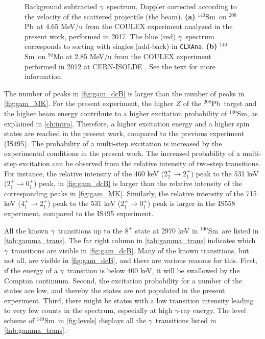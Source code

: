 \documentclass[twoside,english]{uiofysmaster/uiofysmaster}
\newcommand{\Sm}{$^{140}$Sm} %
\newcommand{\Pb}{$^{208}$Pb}
\newcommand{\ga}{$\gamma$}
\let\orgautoref\autoref
\renewcommand{\autoref}
        {%
		 \def\sectionautorefname{Section}%
		 \def\subsectionautorefname{Section}%
		 \def\subsubsectionautorefname{Section}%
		 \def\chapterautorefname{Chapter}%
          \orgautoref}
\begin{document}
\begin{figure}[H]
\begin{subfigure}[t]{0.8\textwidth}
		\caption{}
		\label{fig:gam_MK}
	\end{subfigure}
	\caption{Background subtracted \ga\ spectrum, Doppler corrected according to the velocity of the scattered projectile (the beam).
		\textbf{(a)} \Sm\ on \Pb\ at 4.65 MeV/u from the COULEX experiment analyzed in the present work, performed in 2017.
	 	The blue (red) \ga\ spectrum corresponds to sorting with singles (add-back) in \texttt{CLXAna}.
		\textbf{(b)} \Sm\ on $^{94}$Mo at 2.85 MeV/u from the COULEX experiment performed in 2012 at CERN-ISOLDE \cite{Klintefjord}. 
		See the text for more information.}
	\label{fig:gam_compared}
\end{figure}

The number of peaks in \autoref{fig:gam_dcB} is larger than the number of peaks in \autoref{fig:gam_MK}.
For the present experiment, the higher $Z$ of the \Pb\ target and the higher beam energy contribute to a higher excitation probability of \Sm, as explained in \autoref{ch:intro}. 
Therefore, a higher excitation energy and a higher spin states are reached in the present work, compared to the previous experiment (IS495).
The probability of a multi-step excitation is increased by the experimental conditions in the present work. 
The increased probability of a multi-step excitation can be observed from the relative intensity of two-step transitions. 
For instance, the relative intensity of the 460 keV ($2_2^+ \rightarrow 2_1^+$) peak to the 531 keV ($2_1^+ \rightarrow  0_1^+$) peak, in \autoref{fig:gam_dcB} is larger than the relative intensity of the corresponding peaks in \autoref{fig:gam_MK}.
Similarly, the relative intensity of the 715 keV ($4_1^+ \rightarrow  2_1^+$) peak to the 531 keV ($2_1^+ \rightarrow  0_1^+$) peak is larger in the IS558 experiment, compared to the IS495 experiment.


All the known \ga\ transitions up to the $8^+$ state at 2970 keV in \Sm\ are listed in \autoref{tab:gamma_trans}. 
The far right column in \autoref{tab:gamma_trans} indicates which \ga\ transitions are visible in \autoref{fig:gam_dcB}.
Many of the known transitions, but not all, are visible in \autoref{fig:gam_dcB}, and there are various reasons for this.
First, if the energy of a \ga\ transition is below 400 keV, it will be swallowed by the Compton continuum.
Second, the excitation probability for a number of the states are low, and thereby the states are not populated in the present experiment.
Third, there might be states with a low transition intensity leading to very few counts in the spectrum, especially at high \ga-ray energy.
The level scheme of \Sm\ in \autoref{fig:levels} displays all the \ga\ transitions listed in  \autoref{tab:gamma_trans}.
\end{document}
